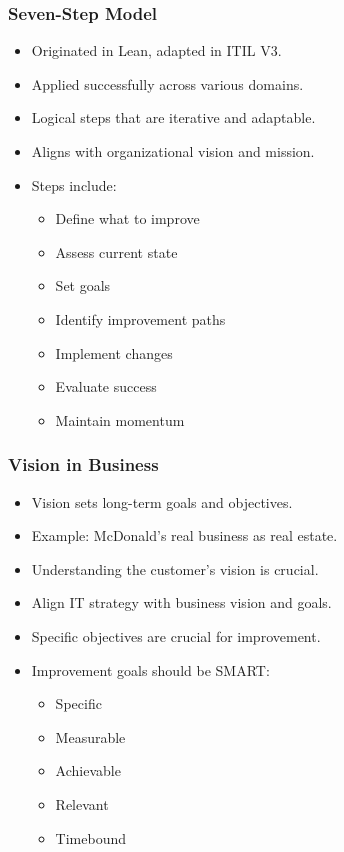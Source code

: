 \documentclass[aspectratio=169, table]{beamer}
\begin{document}
	\begin{frame}
		\frametitle{Seven-Step Model}
		\begin{itemize}
			\item Originated in Lean, adapted in ITIL V3.
			\item Applied successfully across various domains.
			\item Logical steps that are iterative and adaptable.
			\item Aligns with organizational vision and mission.
			\item Steps include:
			\begin{itemize}
				\item Define what to improve
				\item Assess current state
				\item Set goals
				\item Identify improvement paths
				\item Implement changes
				\item Evaluate success
				\item Maintain momentum
			\end{itemize}
		\end{itemize}
	\end{frame}
	
	\begin{frame}
		\frametitle{Vision in Business}
		\begin{itemize}
			\item Vision sets long-term goals and objectives.
			\item Example: McDonald's real business as real estate.
			\item Understanding the customer’s vision is crucial.
			\item Align IT strategy with business vision and goals.
			\item Specific objectives are crucial for improvement.
			\item Improvement goals should be SMART:
			\begin{itemize}
				\item Specific
				\item Measurable
				\item Achievable
				\item Relevant
				\item Timebound
			\end{itemize}
		\end{itemize}
	\end{frame}
	
\end{document}
